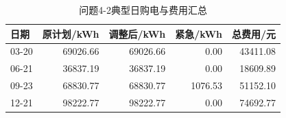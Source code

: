 \begin{table}[H]
\centering\small
\caption{问题4-2典型日购电与费用汇总}
\label{tab:q4_2_daily_summary}
\begin{tabular}{lrrrr}\toprule
日期 & 原计划/kWh & 调整后/kWh & 紧急/kWh & 总费用/元 \\\midrule
03-20 & 69026.66 & 69026.66 & 0.00 & 43411.08 \\
06-21 & 36837.19 & 36837.19 & 0.00 & 18609.89 \\
09-23 & 68830.77 & 68830.77 & 1076.53 & 51152.10 \\
12-21 & 98222.77 & 98222.77 & 0.00 & 74692.77 \\
\bottomrule\end{tabular}
\end{table}
